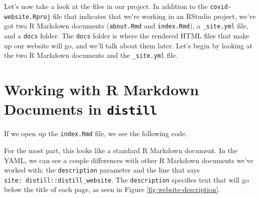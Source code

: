 \documentclass[
]{book}
\newenvironment{Shaded}{\begin{snugshade}}{\end{snugshade}}
\newcommand{\AnnotationTok}[1]{\textcolor[rgb]{0.56,0.35,0.01}{\textbf{\textit{#1}}}}
\newcommand{\CommentTok}[1]{\textcolor[rgb]{0.56,0.35,0.01}{\textit{#1}}}
\newcommand{\InformationTok}[1]{\textcolor[rgb]{0.56,0.35,0.01}{\textbf{\textit{#1}}}}
\begin{document}
Let's now take a look at the files in our project. In addition to the \texttt{covid-website.Rproj} file that indicates that we're working in an RStudio project, we've got two R Markdown documents (\texttt{about.Rmd} and \texttt{index.Rmd}), a \texttt{\_site.yml} file, and a \texttt{docs} folder. The \texttt{docs} folder is where the rendered HTML files that make up our website will go, and we'll talk about them later. Let's begin by looking at the two R Markdown documents and the \texttt{\_site.yml} file.

\hypertarget{working-with-r-markdown-documents-in-distill}{%
\section*{\texorpdfstring{Working with R Markdown Documents in \texttt{distill}}{Working with R Markdown Documents in distill}}\label{working-with-r-markdown-documents-in-distill}}

If we open up the \texttt{index.Rmd} file, we see the following code.

\begin{Shaded}
\end{Shaded}

For the most part, this looks like a standard R Markdown document. In the YAML, we can see a couple differences with other R Markdown documents we've worked with: the \texttt{description} parameter and the line that says \texttt{site:\ distill::distill\_website}. The \texttt{description} specifies text that will go below the title of each page, as seen in Figure \ref{fig:website-description}.
\end{document}
